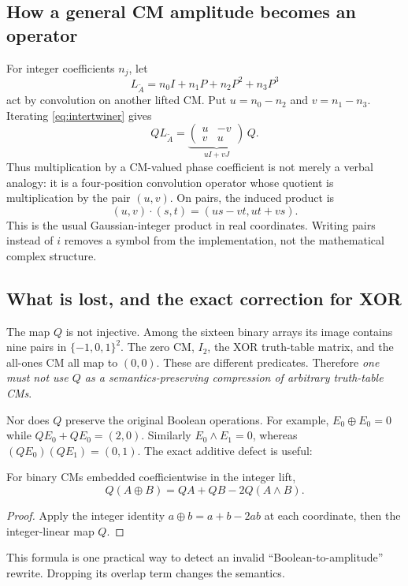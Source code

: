 \subsection{How a general CM amplitude becomes an operator}
For integer coefficients $n_j$, let
\begin{equation}
 L_{\widetilde A}=n_0I+n_1P+n_2P^2+n_3P^3
\end{equation}
act by convolution on another lifted CM. Put $u=n_0-n_2$ and $v=n_1-n_3$. Iterating \cref{eq:intertwiner} gives
\begin{equation}\label{eq:operatorbridge}
 QL_{\widetilde A}=
 \underbrace{\begin{pmatrix}u&-v\\v&u\end{pmatrix}}_{uI+vJ}\,Q.
\end{equation}
Thus multiplication by a CM-valued phase coefficient is not merely a verbal analogy: it is a four-position convolution operator whose quotient is multiplication by the pair $(u,v)$. On pairs, the induced product is
\begin{equation}
 (u,v)\cdot(s,t)=(us-vt,ut+vs).
\end{equation}
This is the usual Gaussian-integer product in real coordinates. Writing pairs instead of $i$ removes a symbol from the implementation, not the mathematical complex structure.

\subsection{What is lost, and the exact correction for XOR}
The map $Q$ is not injective. Among the sixteen binary arrays its image contains nine pairs in $\{-1,0,1\}^2$. The zero CM, $I_2$, the XOR truth-table matrix, and the all-ones CM all map to $(0,0)$. These are different predicates. Therefore \emph{one must not use $Q$ as a semantics-preserving compression of arbitrary truth-table CMs}.

Nor does $Q$ preserve the original Boolean operations. For example, $E_0\oplus E_0=0$ while $QE_0+QE_0=(2,0)$. Similarly $E_0\land E_1=0$, whereas $(QE_0)(QE_1)=(0,1)$. The exact additive defect is useful:
\begin{proposition}\label{prop:carry}
For binary CMs embedded coefficientwise in the integer lift,
\begin{equation}\label{eq:carry}
 Q(A\oplus B)=QA+QB-2Q(A\land B).
\end{equation}
\end{proposition}
\begin{proof}
Apply the integer identity $a\oplus b=a+b-2ab$ at each coordinate, then the integer-linear map $Q$.
\end{proof}
This formula is one practical way to detect an invalid ``Boolean-to-amplitude'' rewrite. Dropping its overlap term changes the semantics.

